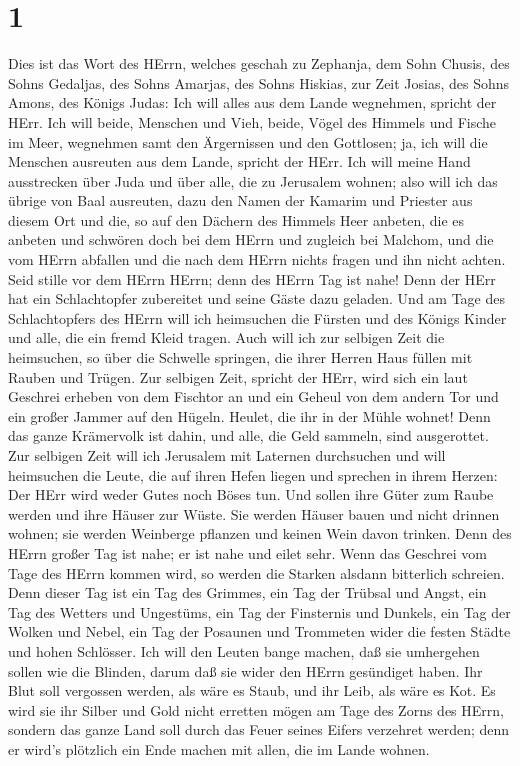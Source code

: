 \hypertarget{section}{%
\section{1}\label{section}}

 Dies ist das Wort des HErrn, welches geschah zu Zephanja,
dem Sohn Chusis, des Sohns Gedaljas, des Sohns Amarjas, des Sohns
Hiskias, zur Zeit Josias, des Sohns Amons, des Königs Judas:
 Ich will alles aus dem Lande wegnehmen, spricht der HErr.
 Ich will beide, Menschen und Vieh, beide, Vögel des Himmels
und Fische im Meer, wegnehmen samt den Ärgernissen und den Gottlosen;
ja, ich will die Menschen ausreuten aus dem Lande, spricht der HErr.
 Ich will meine Hand ausstrecken über Juda und über alle,
die zu Jerusalem wohnen; also will ich das übrige von Baal ausreuten,
dazu den Namen der Kamarim und Priester aus diesem Ort  und
die, so auf den Dächern des Himmels Heer anbeten, die es anbeten und
schwören doch bei dem HErrn und zugleich bei Malchom,  und
die vom HErrn abfallen und die nach dem HErrn nichts fragen und ihn
nicht achten.  Seid stille vor dem HErrn HErrn; denn des
HErrn Tag ist nahe! Denn der HErr hat ein Schlachtopfer zubereitet und
seine Gäste dazu geladen.  Und am Tage des Schlachtopfers
des HErrn will ich heimsuchen die Fürsten und des Königs Kinder und
alle, die ein fremd Kleid tragen.  Auch will ich zur
selbigen Zeit die heimsuchen, so über die Schwelle springen, die ihrer
Herren Haus füllen mit Rauben und Trügen.  Zur selbigen
Zeit, spricht der HErr, wird sich ein laut Geschrei erheben von dem
Fischtor an und ein Geheul von dem andern Tor und ein großer Jammer auf
den Hügeln.  Heulet, die ihr in der Mühle wohnet! Denn das
ganze Krämervolk ist dahin, und alle, die Geld sammeln, sind
ausgerottet.  Zur selbigen Zeit will ich Jerusalem mit
Laternen durchsuchen und will heimsuchen die Leute, die auf ihren Hefen
liegen und sprechen in ihrem Herzen: Der HErr wird weder Gutes noch
Böses tun.  Und sollen ihre Güter zum Raube werden und ihre
Häuser zur Wüste. Sie werden Häuser bauen und nicht drinnen wohnen; sie
werden Weinberge pflanzen und keinen Wein davon trinken. 
Denn des HErrn großer Tag ist nahe; er ist nahe und eilet sehr. Wenn das
Geschrei vom Tage des HErrn kommen wird, so werden die Starken alsdann
bitterlich schreien.  Denn dieser Tag ist ein Tag des
Grimmes, ein Tag der Trübsal und Angst, ein Tag des Wetters und
Ungestüms, ein Tag der Finsternis und Dunkels, ein Tag der Wolken und
Nebel,  ein Tag der Posaunen und Trommeten wider die festen
Städte und hohen Schlösser.  Ich will den Leuten bange
machen, daß sie umhergehen sollen wie die Blinden, darum daß sie wider
den HErrn gesündiget haben. Ihr Blut soll vergossen werden, als wäre es
Staub, und ihr Leib, als wäre es Kot.  Es wird sie ihr
Silber und Gold nicht erretten mögen am Tage des Zorns des HErrn,
sondern das ganze Land soll durch das Feuer seines Eifers verzehret
werden; denn er wird's plötzlich ein Ende machen mit allen, die im Lande
wohnen.

